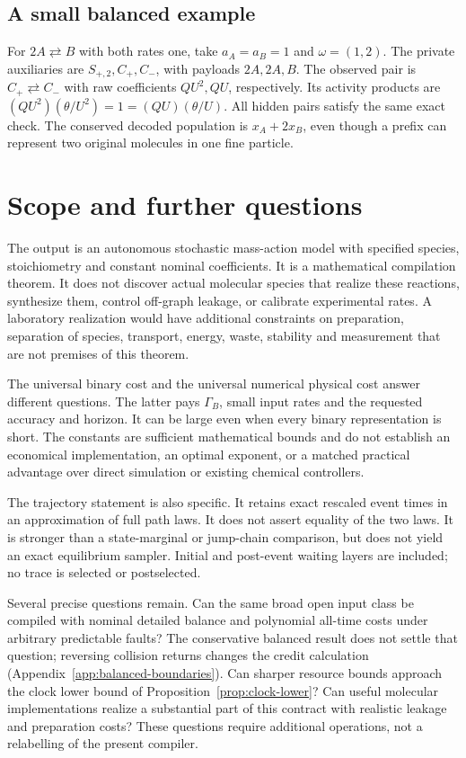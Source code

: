 \documentclass[11pt,reqno]{amsart}
\theoremstyle{definition}
\theoremstyle{remark}
\begin{document}
\subsection{A small balanced example}
For $2A\rightleftarrows B$ with both rates one, take $a_A=a_B=1$ and
$\omega=(1,2)$. The private auxiliaries are $S_{+,2},C_+,C_-$, with payloads
$2A,2A,B$. The observed pair is $C_+\rightleftarrows C_-$ with raw
coefficients $QU^2,QU$, respectively. Its activity products are
$(QU^2)(\theta/U^2)=1=(QU)(\theta/U)$. All hidden pairs satisfy the same
exact check. The conserved decoded population is $x_A+2x_B$, even though a
prefix can represent two original molecules in one fine particle.

\section{Scope and further questions}
The output is an autonomous stochastic mass-action model with specified
species, stoichiometry and constant nominal coefficients. It is a mathematical
compilation theorem. It does not discover actual molecular species that realize
these reactions, synthesize them, control off-graph leakage, or calibrate
experimental rates. A laboratory realization would have additional constraints
on preparation, separation of species, transport, energy, waste, stability and
measurement that are not premises of this theorem.

The universal binary cost and the universal numerical physical cost answer
different questions. The latter pays $\Gamma_B$, small input rates and the
requested accuracy and horizon. It can be large even when every binary
representation is short. The constants are sufficient mathematical bounds and
do not establish an economical implementation, an optimal exponent, or a
matched practical advantage over direct simulation or existing chemical
controllers.

The trajectory statement is also specific. It retains exact rescaled event
times in an approximation of full path laws. It does not assert equality of
the two laws. It is stronger than a state-marginal or jump-chain comparison,
but does not yield an exact equilibrium sampler. Initial and post-event
waiting layers are included; no trace is selected or postselected.

Several precise questions remain. Can the same broad open input class be
compiled with nominal detailed balance and polynomial all-time costs under
arbitrary predictable faults? The conservative balanced result does not settle
that question; reversing collision returns changes the credit calculation
(Appendix~\ref{app:balanced-boundaries}). Can sharper resource bounds approach
the clock lower bound of Proposition~\ref{prop:clock-lower}? Can useful molecular
implementations realize a substantial part of this contract with realistic
leakage and preparation costs? These questions require additional operations,
not a relabelling of the present compiler.
\end{document}
